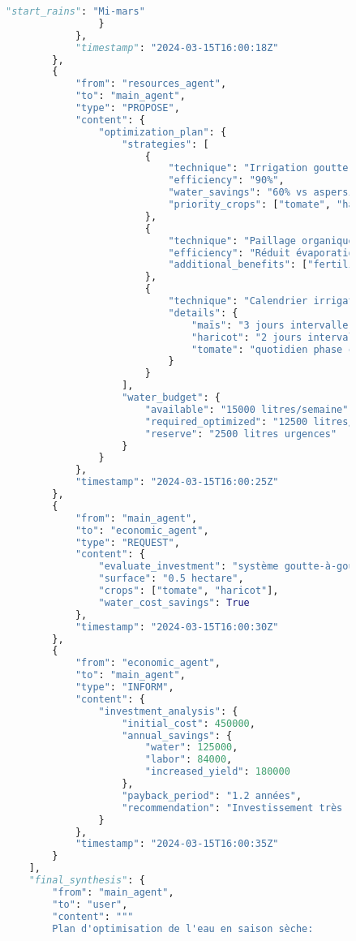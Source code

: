 \begin{figure}[H]
\begin{lstlisting}[language=Python, caption=Exemples de communications inter-agents en action]
                    "start_rains": "Mi-mars"
                }
            },
            "timestamp": "2024-03-15T16:00:18Z"
        },
        {
            "from": "resources_agent",
            "to": "main_agent",
            "type": "PROPOSE",
            "content": {
                "optimization_plan": {
                    "strategies": [
                        {
                            "technique": "Irrigation goutte-à-goutte",
                            "efficiency": "90%",
                            "water_savings": "60% vs aspersion",
                            "priority_crops": ["tomate", "haricot"]
                        },
                        {
                            "technique": "Paillage organique",
                            "efficiency": "Réduit évaporation 70%",
                            "additional_benefits": ["fertilité", "température sol"]
                        },
                        {
                            "technique": "Calendrier irrigation",
                            "details": {
                                "maïs": "3 jours intervalle, matin",
                                "haricot": "2 jours intervalle",
                                "tomate": "quotidien phase critique"
                            }
                        }
                    ],
                    "water_budget": {
                        "available": "15000 litres/semaine",
                        "required_optimized": "12500 litres/semaine",
                        "reserve": "2500 litres urgences"
                    }
                }
            },
            "timestamp": "2024-03-15T16:00:25Z"
        },
        {
            "from": "main_agent",
            "to": "economic_agent",
            "type": "REQUEST",
            "content": {
                "evaluate_investment": "système goutte-à-goutte",
                "surface": "0.5 hectare",
                "crops": ["tomate", "haricot"],
                "water_cost_savings": True
            },
            "timestamp": "2024-03-15T16:00:30Z"
        },
        {
            "from": "economic_agent",
            "to": "main_agent",
            "type": "INFORM",
            "content": {
                "investment_analysis": {
                    "initial_cost": 450000,
                    "annual_savings": {
                        "water": 125000,
                        "labor": 84000,
                        "increased_yield": 180000
                    },
                    "payback_period": "1.2 années",
                    "recommendation": "Investissement très rentable"
                }
            },
            "timestamp": "2024-03-15T16:00:35Z"
        }
    ],
    "final_synthesis": {
        "from": "main_agent",
        "to": "user",
        "content": """
        Plan d'optimisation de l'eau en saison sèche:


\end{lstlisting}
\end{figure}

